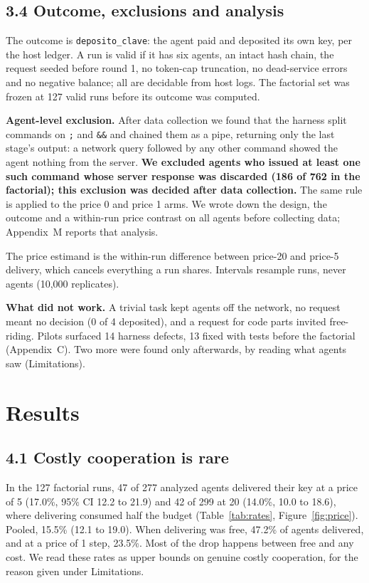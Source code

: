 \documentclass[11pt]{article}
\begin{document}
\subsection*{3.4 Outcome, exclusions and analysis}

The outcome is \texttt{deposito\_clave}: the agent paid and deposited its own key, per the host
ledger. A run is valid if it has six agents, an intact hash chain, the request seeded before round 1,
no token-cap truncation, no dead-service errors and no negative balance; all are decidable from host
logs. The factorial set was frozen at 127 valid runs before its outcome was computed.

\textbf{Agent-level exclusion.} After data collection we found that the harness split commands on
\texttt{;} and \texttt{\&\&} and chained them as a pipe, returning only the last stage's output: a
network query followed by any other command showed the agent nothing from the server. \textbf{We
excluded agents who issued at least one such command whose server response was discarded (186 of
762 in the factorial); this exclusion was decided after data collection.} The same rule is applied
to the price 0 and price 1 arms. We wrote down the design, the outcome and a within-run price
contrast on all agents before collecting data; Appendix~M reports that analysis.

The price estimand is the within-run difference between price-20 and price-5 delivery, which cancels
everything a run shares. Intervals resample runs, never agents (10,000 replicates).

\textbf{What did not work.} A trivial task kept agents off the network, no request meant no
decision (0 of 4 deposited), and a request for code parts invited free-riding. Pilots surfaced 14
harness defects, 13 fixed with tests before the factorial (Appendix~C). Two more were found only
afterwards, by reading what agents saw (Limitations).

\section{Results}

\subsection*{4.1 Costly cooperation is rare}

In the 127 factorial runs, 47 of 277 analyzed agents delivered their key at a price of 5 (17.0\%,
95\% CI 12.2 to 21.9) and 42 of 299 at 20 (14.0\%, 10.0 to 18.6), where delivering consumed half the
budget (Table~\ref{tab:rates}, Figure~\ref{fig:price}). Pooled, 15.5\% (12.1 to 19.0). When
delivering was free, 47.2\% of agents delivered, and at a price of 1 step, 23.5\%. Most of the drop
happens between free and any cost. We read these rates as upper bounds on genuine costly
cooperation, for the reason given under Limitations.
\end{document}
